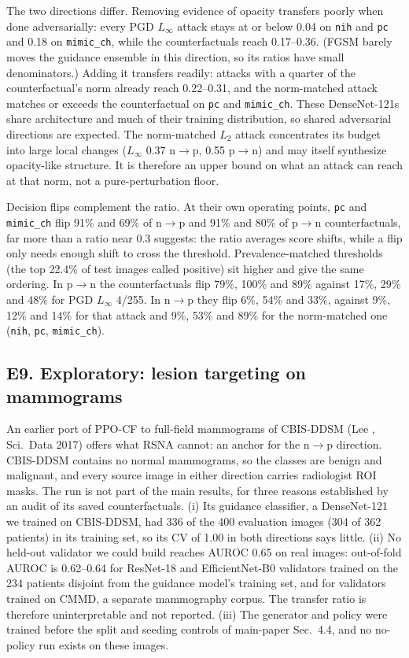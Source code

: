 The two directions differ. Removing evidence of opacity transfers poorly when done adversarially: every PGD $L_\infty$ attack stays at or below 0.04 on \texttt{nih} and \texttt{pc} and 0.18 on \texttt{mimic\_ch}, while the counterfactuals reach 0.17--0.36. (FGSM barely moves the guidance ensemble in this direction, so its ratios have small denominators.) Adding it transfers readily: attacks with a quarter of the counterfactual's norm already reach 0.22--0.31, and the norm-matched attack matches or exceeds the counterfactual on \texttt{pc} and \texttt{mimic\_ch}. These DenseNet-121s share architecture and much of their training distribution, so shared adversarial directions are expected. The norm-matched $L_2$ attack concentrates its budget into large local changes ($L_\infty$ 0.37 n$\to$p, 0.55 p$\to$n) and may itself synthesize opacity-like structure. It is therefore an upper bound on what an attack can reach at that norm, not a pure-perturbation floor.

Decision flips complement the ratio. At their own operating points, \texttt{pc} and \texttt{mimic\_ch} flip 91\% and 69\% of n$\to$p and 91\% and 80\% of p$\to$n counterfactuals, far more than a ratio near 0.3 suggests: the ratio averages score shifts, while a flip only needs enough shift to cross the threshold. Prevalence-matched thresholds (the top 22.4\% of test images called positive) sit higher and give the same ordering. In p$\to$n the counterfactuals flip 79\%, 100\% and 89\% against 17\%, 29\% and 48\% for PGD $L_\infty$ 4/255. In n$\to$p they flip 6\%, 54\% and 33\%, against 9\%, 12\% and 14\% for that attack and 9\%, 53\% and 89\% for the norm-matched one (\texttt{nih}, \texttt{pc}, \texttt{mimic\_ch}).

\subsection*{E9. Exploratory: lesion targeting on mammograms}
\label{sec:suppl-breast}

An earlier port of PPO-CF to full-field mammograms of CBIS-DDSM (Lee \etal, Sci.\ Data 2017) offers what RSNA cannot: an anchor for the n$\to$p direction. CBIS-DDSM contains no normal mammograms, so the classes are benign and malignant, and every source image in either direction carries radiologist ROI masks. The run is not part of the main results, for three reasons established by an audit of its saved counterfactuals. (i) Its guidance classifier, a DenseNet-121 we trained on CBIS-DDSM, had 336 of the 400 evaluation images (304 of 362 patients) in its training set, so its CV of 1.00 in both directions says little. (ii) No held-out validator we could build reaches AUROC 0.65 on real images: out-of-fold AUROC is 0.62--0.64 for ResNet-18 and EfficientNet-B0 validators trained on the 234 patients disjoint from the guidance model's training set, and for validators trained on CMMD, a separate mammography corpus. The transfer ratio is therefore uninterpretable and not reported. (iii) The generator and policy were trained before the split and seeding controls of main-paper Sec.~4.4, and no no-policy run exists on these images.

